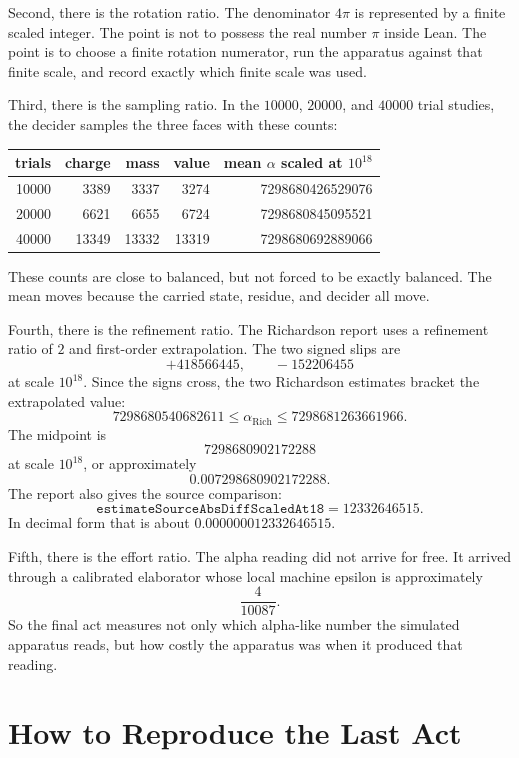 Second, there is the rotation ratio. The denominator \(4\pi\) is represented by a finite scaled integer. The
point is not to possess the real number \(\pi\) inside Lean. The point is to choose a finite rotation numerator,
run the apparatus against that finite scale, and record exactly which finite scale was used.

Third, there is the sampling ratio. In the \(10000\), \(20000\), and \(40000\) trial studies, the decider samples
the three faces with these counts:
\begin{center}\small
\begin{tabular}{r|r|r|r|r}
trials & charge & mass & value & mean \(\alpha\) scaled at \(10^{18}\)\\
\hline
10000 & 3389 & 3337 & 3274 & 7298680426529076\\
20000 & 6621 & 6655 & 6724 & 7298680845095521\\
40000 & 13349 & 13332 & 13319 & 7298680692889066
\end{tabular}
\end{center}
These counts are close to balanced, but not forced to be exactly balanced. The mean moves because the carried
state, residue, and decider all move.

Fourth, there is the refinement ratio. The Richardson report uses a refinement ratio of \(2\) and first-order
extrapolation. The two signed slips are
\[
  +418566445,\qquad -152206455
\]
at scale \(10^{18}\). Since the signs cross, the two Richardson estimates bracket the extrapolated value:
\[
  7298680540682611
  \le
  \alpha_{\mathrm{Rich}}
  \le
  7298681263661966.
\]
The midpoint is
\[
  7298680902172288
\]
at scale \(10^{18}\), or approximately
\[
  0.007298680902172288.
\]
The report also gives the source comparison:
\[
  \texttt{estimateSourceAbsDiffScaledAt18} = 12332646515.
\]
In decimal form that is about \(0.000000012332646515\).

Fifth, there is the effort ratio. The alpha reading did not arrive for free. It arrived through a calibrated
elaborator whose local machine epsilon is approximately
\[
  \frac{4}{10087}.
\]
So the final act measures not only which alpha-like number the simulated apparatus reads, but how costly the
apparatus was when it produced that reading.

\section{How to Reproduce the Last Act}

